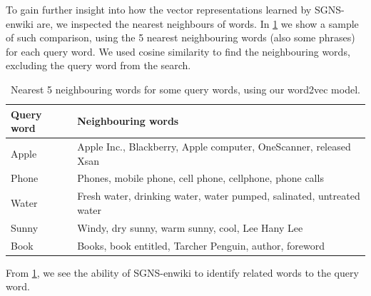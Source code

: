 To gain further insight into how the vector representations learned by SGNS-enwiki are, we inspected the nearest neighbours of words. In \cref{table:word2vec-nearest-neighbours-words} we show a sample of such comparison, using the 5 nearest neighbouring words (also some phrases) for each query word. We used cosine similarity to find the neighbouring words, excluding the query word from the search.
\begin{table}[H]
    \centering
    \begin{tabular}{@{}ll@{}}
    \toprule
    Query word & Neighbouring words \\ \midrule
    \trcolor
    Apple        & Apple Inc., Blackberry, Apple computer, OneScanner, released Xsan \\
    Phone      & Phones, mobile phone, cell phone, cellphone, phone calls \\
    \trcolor
    Water   & Fresh water, drinking water, water pumped, salinated, untreated water \\
    Sunny      & Windy, dry sunny, warm sunny, cool, Lee Hany Lee \\
    \trcolor
    Book      & Books, book entitled, Tarcher Penguin, author, foreword \\ \bottomrule
    \end{tabular}
    \caption{Nearest 5 neighbouring words for some query words, using our word2vec model.}
    \label{table:word2vec-nearest-neighbours-words}
\end{table}
From \cref{table:word2vec-nearest-neighbours-words}, we see the ability of SGNS-enwiki to identify related words to the query word.


